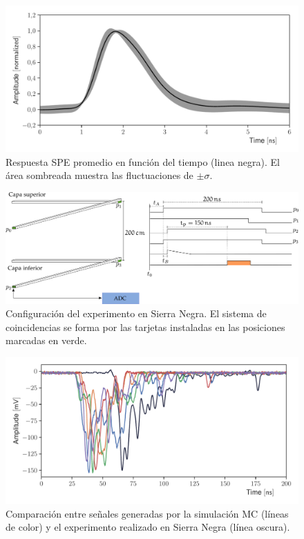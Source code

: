 \begin{figure}
        \centering
        \includegraphics[width=\textwidth]{sphe-signal.pdf}
        \caption{Respuesta SPE promedio en función del tiempo (linea negra). El área sombreada muestra las fluctuaciones de $\pm\sigma$.}
        \label{fig:sphe}
\end{figure}

\begin{figure}
        \centering
        \includegraphics[width=\textwidth]{muons-experiment.pdf}
        \caption{Configuración del experimento en Sierra Negra. El sistema de coincidencias se forma por las tarjetas instaladas en las posiciones marcadas en verde.}
        \label{fig:muons-experiment}
\end{figure}


\begin{figure}
        \centering
        \includegraphics[width=\textwidth]{muon-pulse.pdf}
        \caption{Comparación entre señales generadas por la simulación MC (líneas de color) y el experimento realizado en Sierra Negra (línea oscura).}
        \label{fig:muon-pulse}
\end{figure}

